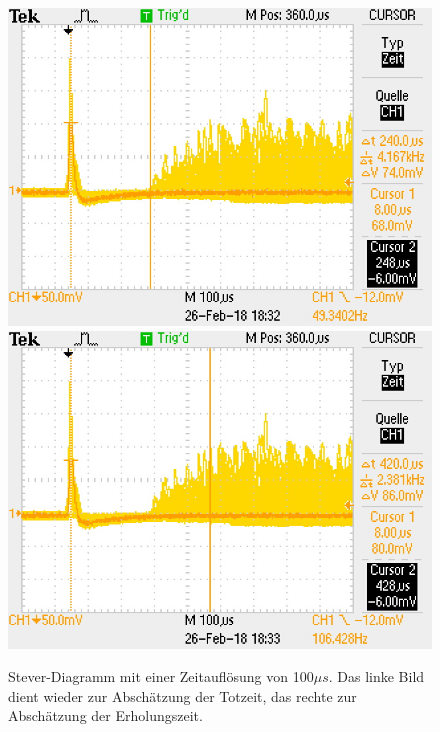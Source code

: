\documentclass[12pt,a4paper]{article}
\begin{document}
\begin{figure}
\centering
\includegraphics[scale=0.49]{Bilder/Stever/Stever2_1.PNG}
\includegraphics[scale=0.49]{Bilder/Stever/Stever2_2.PNG}
\caption{Stever-Diagramm mit einer Zeitauflösung von 100$\mu s$. Das linke Bild dient wieder zur Abschätzung der Totzeit, das rechte zur Abschätzung der Erholungszeit.}
\label{fig:Stever2}
\end{figure}
\end{document}
